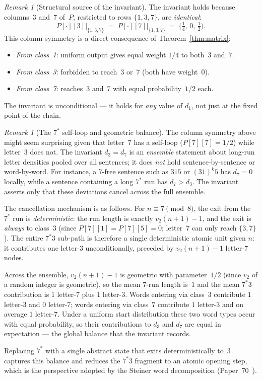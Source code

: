 \documentclass[12pt]{article}
\theoremstyle{definition}
\theoremstyle{remark}
\newtheorem{remark}[theorem]{Remark}
\newcommand{\vt}{v_2}
\begin{document}
\begin{remark}[Structural source of the invariant]
The invariant holds because columns~3 and~7 of~$P$, restricted to rows
$\{1,3,7\}$, are \emph{identical}:
\[
  P[\cdot][3]\big|_{\{1,3,7\}} \;=\; P[\cdot][7]\big|_{\{1,3,7\}}
  \;=\; \bigl(\tfrac{1}{4},\, 0,\, \tfrac{1}{2}\bigr).
\]
This column symmetry is a direct consequence of Theorem~\ref{thm:matrix}:
\begin{itemize}
  \item \emph{From class~1}: uniform output gives equal weight $1/4$ to both~3 and~7.
  \item \emph{From class~3}: forbidden to reach~3 or~7 (both have weight~0).
  \item \emph{From class~7}: reaches~3 and~7 with equal probability~$1/2$ each.
\end{itemize}
The invariant is unconditional — it holds for \emph{any} value of $d_1$,
not just at the fixed point of the chain.
\end{remark}

\begin{remark}[The $7^*$ self-loop and geometric balance]
\label{rem:7star}
The column symmetry above might seem surprising given that letter~$7$ has a
self-loop ($P[7][7] = 1/2$) while letter~$3$ does not.
The invariant $d_3 = d_7$ is an \emph{ensemble} statement about long-run letter
densities pooled over all sentences; it does \emph{not} hold sentence-by-sentence
or word-by-word.
For instance, a $7$-free sentence such as $315$ or $(31)^k 5$ has $d_7 = 0$
locally, while a sentence containing a long $7^*$ run has $d_7 > d_3$.
The invariant asserts only that these deviations cancel across the full ensemble.

The cancellation mechanism is as follows.
For $n \equiv 7 \pmod 8$, the exit from the $7^*$ run is \emph{deterministic}:
the run length is exactly $\vt(n+1) - 1$, and the exit is \emph{always} to
class~$3$ (since $P[7][1] = P[7][5] = 0$; letter~$7$ can only reach $\{3,7\}$).
The entire $7^*3$ sub-path is therefore a single deterministic atomic unit given
$n$: it contributes one letter-$3$ unconditionally, preceded by $\vt(n+1)-1$
letter-$7$ nodes.

Across the ensemble, $\vt(n+1) - 1$ is geometric with parameter~$1/2$
(since $\vt$ of a random integer is geometric), so the mean $7$-run length
is~$1$ and the mean $7^*3$ contribution is $1$ letter-$7$ plus $1$ letter-$3$.
Words entering via class~$3$ contribute $1$ letter-$3$ and $0$ letter-$7$;
words entering via class~$7$ contribute $1$ letter-$3$ and on average $1$
letter-$7$.
Under a uniform start distribution these two word types occur with equal
probability, so their contributions to $d_3$ and $d_7$ are equal in
expectation --- the global balance that the invariant records.

Replacing $7^*$ with a single abstract state that exits deterministically to~$3$
captures this balance and reduces the $7^*3$ fragment to an atomic opening step,
which is the perspective adopted by the Steiner word decomposition
(Paper~70~\cite{paper70}).
\end{remark}
\end{document}
